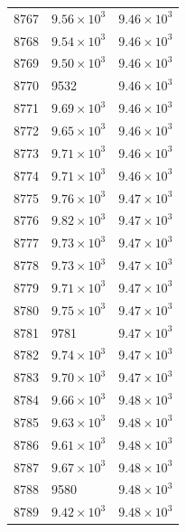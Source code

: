\begin{table}[H]
\begin{tabular}{lll}
8767 & $\displaystyle 9.56 \times 10^{3}$ & $\displaystyle 9.46 \times 10^{3}$ \\
8768 & $\displaystyle 9.54 \times 10^{3}$ & $\displaystyle 9.46 \times 10^{3}$ \\
8769 & $\displaystyle 9.50 \times 10^{3}$ & $\displaystyle 9.46 \times 10^{3}$ \\
8770 & 9532 & $\displaystyle 9.46 \times 10^{3}$ \\
8771 & $\displaystyle 9.69 \times 10^{3}$ & $\displaystyle 9.46 \times 10^{3}$ \\
8772 & $\displaystyle 9.65 \times 10^{3}$ & $\displaystyle 9.46 \times 10^{3}$ \\
8773 & $\displaystyle 9.71 \times 10^{3}$ & $\displaystyle 9.46 \times 10^{3}$ \\
8774 & $\displaystyle 9.71 \times 10^{3}$ & $\displaystyle 9.46 \times 10^{3}$ \\
8775 & $\displaystyle 9.76 \times 10^{3}$ & $\displaystyle 9.47 \times 10^{3}$ \\
8776 & $\displaystyle 9.82 \times 10^{3}$ & $\displaystyle 9.47 \times 10^{3}$ \\
8777 & $\displaystyle 9.73 \times 10^{3}$ & $\displaystyle 9.47 \times 10^{3}$ \\
8778 & $\displaystyle 9.73 \times 10^{3}$ & $\displaystyle 9.47 \times 10^{3}$ \\
8779 & $\displaystyle 9.71 \times 10^{3}$ & $\displaystyle 9.47 \times 10^{3}$ \\
8780 & $\displaystyle 9.75 \times 10^{3}$ & $\displaystyle 9.47 \times 10^{3}$ \\
8781 & 9781 & $\displaystyle 9.47 \times 10^{3}$ \\
8782 & $\displaystyle 9.74 \times 10^{3}$ & $\displaystyle 9.47 \times 10^{3}$ \\
8783 & $\displaystyle 9.70 \times 10^{3}$ & $\displaystyle 9.47 \times 10^{3}$ \\
8784 & $\displaystyle 9.66 \times 10^{3}$ & $\displaystyle 9.48 \times 10^{3}$ \\
8785 & $\displaystyle 9.63 \times 10^{3}$ & $\displaystyle 9.48 \times 10^{3}$ \\
8786 & $\displaystyle 9.61 \times 10^{3}$ & $\displaystyle 9.48 \times 10^{3}$ \\
8787 & $\displaystyle 9.67 \times 10^{3}$ & $\displaystyle 9.48 \times 10^{3}$ \\
8788 & 9580 & $\displaystyle 9.48 \times 10^{3}$ \\
8789 & $\displaystyle 9.42 \times 10^{3}$ & $\displaystyle 9.48 \times 10^{3}$ \\

\end{tabular}
\end{table}
